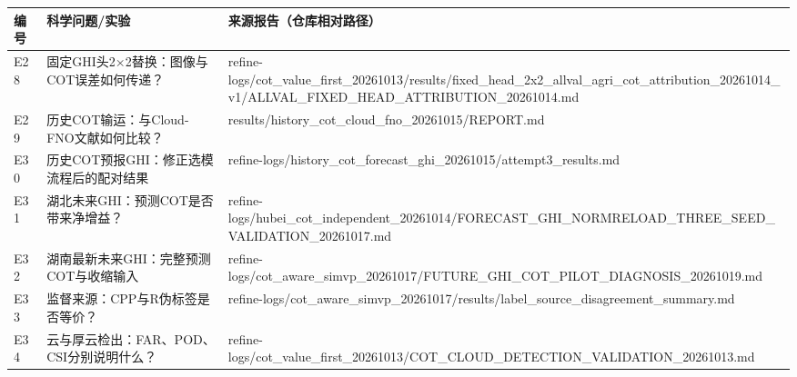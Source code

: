 \documentclass[UTF8,a4paper,landscape,10pt]{ctexart}
\begin{document}
\begin{center}\small
\begin{adjustbox}{max totalheight=0.58\textheight,max width=\linewidth}
\begin{minipage}{\linewidth}\begin{tabularx}{\linewidth}{>{\hsize=0.3000\hsize\raggedright\arraybackslash}X>{\hsize=0.9000\hsize\raggedright\arraybackslash}X>{\hsize=1.8000\hsize\raggedright\arraybackslash}X}\toprule
\textbf{编号} & \textbf{科学问题/\allowbreak{}实验} & \textbf{来源报告（仓库相对路径）} \\ \midrule
E28 & 固定GHI头2×2替换：图像与COT误差如何传递？ & refine-logs/\allowbreak{}cot\_\allowbreak{}value\_\allowbreak{}first\_\allowbreak{}20261013/\allowbreak{}results/\allowbreak{}fixed\_\allowbreak{}head\_\allowbreak{}2x2\_\allowbreak{}allval\_\allowbreak{}agri\_\allowbreak{}cot\_\allowbreak{}attribution\_\allowbreak{}20261014\_\allowbreak{}v1/\allowbreak{}ALLVAL\_\allowbreak{}FIXED\_\allowbreak{}HEAD\_\allowbreak{}ATTRIBUTION\_\allowbreak{}20261014.md \\
E29 & 历史COT输运：与Cloud-FNO文献如何比较？ & results/\allowbreak{}history\_\allowbreak{}cot\_\allowbreak{}cloud\_\allowbreak{}fno\_\allowbreak{}20261015/\allowbreak{}REPORT.md \\
E30 & 历史COT预报GHI：修正选模流程后的配对结果 & refine-logs/\allowbreak{}history\_\allowbreak{}cot\_\allowbreak{}forecast\_\allowbreak{}ghi\_\allowbreak{}20261015/\allowbreak{}attempt3\_\allowbreak{}results.md \\
E31 & 湖北未来GHI：预测COT是否带来净增益？ & refine-logs/\allowbreak{}hubei\_\allowbreak{}cot\_\allowbreak{}independent\_\allowbreak{}20261014/\allowbreak{}FORECAST\_\allowbreak{}GHI\_\allowbreak{}NORMRELOAD\_\allowbreak{}THREE\_\allowbreak{}SEED\_\allowbreak{}VALIDATION\_\allowbreak{}20261017.md \\
E32 & 湖南最新未来GHI：完整预测COT与收缩输入 & refine-logs/\allowbreak{}cot\_\allowbreak{}aware\_\allowbreak{}simvp\_\allowbreak{}20261017/\allowbreak{}FUTURE\_\allowbreak{}GHI\_\allowbreak{}COT\_\allowbreak{}PILOT\_\allowbreak{}DIAGNOSIS\_\allowbreak{}20261019.md \\
E33 & 监督来源：CPP与R伪标签是否等价？ & refine-logs/\allowbreak{}cot\_\allowbreak{}aware\_\allowbreak{}simvp\_\allowbreak{}20261017/\allowbreak{}results/\allowbreak{}label\_\allowbreak{}source\_\allowbreak{}disagreement\_\allowbreak{}summary.md \\
E34 & 云与厚云检出：FAR、POD、CSI分别说明什么？ & refine-logs/\allowbreak{}cot\_\allowbreak{}value\_\allowbreak{}first\_\allowbreak{}20261013/\allowbreak{}COT\_\allowbreak{}CLOUD\_\allowbreak{}DETECTION\_\allowbreak{}VALIDATION\_\allowbreak{}20261013.md \\

\end{tabularx}
\end{minipage}
\end{adjustbox}
\end{center}
\end{document}
